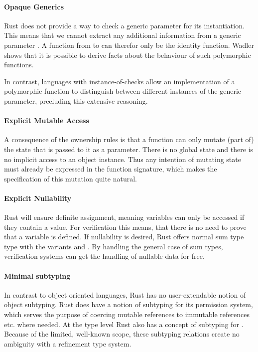 \documentclass[twoside, english, final]{sdqthesis}
\theoremstyle{definition}
\begin{document}
\paragraph*{Opaque Generics} Rust does not provide a way to check a generic parameter for its instantiation. This means that we cannot extract any additional information from a generic parameter . A function from  to  can therefor only be the identity function.
Wadler \cite{wadler_theorems_1989} shows that it is possible to derive facts about the behaviour of such polymorphic functions.

In contrast, languages with instance-of-checks allow an implementation of a polymorphic function to distinguish between different instances of the generic parameter, precluding this extensive reasoning.

\paragraph*{Explicit Mutable Access} A consequence of the ownership rules is that a function can only mutate (part of) the state that is passed to it as a parameter. There is no global state and there is no implicit access to an object instance. Thus any intention of mutating state must already be expressed in the function signature, which makes the specification of this mutation quite natural.

\paragraph*{Explicit Nullability} Rust will ensure definite assignment, meaning variables can only be accessed if they contain a value. For verification this means, that there is no need to prove that a variable is defined. If nullability is desired, Rust offers normal sum type  type with the variants  and . 
By handling the general case of sum types, verification systems can get the handling of nullable data for free.

\paragraph*{Minimal subtyping} In contrast to object oriented languages, Rust has no user-extendable notion of object subtyping. 
Rust does have a notion of subtyping for its permission system, which serves the purpose of coercing mutable references  to immutable references  etc. where needed. 
At the type level Rust also has a concept of subtyping for .
Because of the limited, well-known scope, these subtyping relations create no ambiguity with a refinement type system. 
\end{document}
